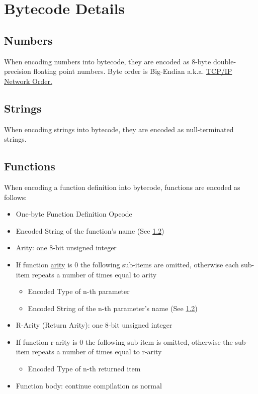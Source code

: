 \documentclass{article}
\begin{document}
\clearpage
\section{Bytecode Details}

\subsection{Numbers}
When encoding numbers into bytecode, they are encoded as 8-byte double-precision floating point numbers. Byte order is Big-Endian a.k.a. \href{https://www.rfc-editor.org/rfc/rfc1700}{TCP/IP Network Order.}

\subsection{Strings} \label{ssec:stringencode}
When encoding strings into bytecode, they are encoded as null-terminated strings.

\subsection{Functions}
When encoding a function definition into bytecode, functions are encoded as follows:
\begin{itemize}
	\item One-byte Function Definition Opcode
	\item Encoded String of the function's name (See \ref{ssec:stringencode})
	\item Arity: one 8-bit unsigned integer
	\item If function \href{https://en.wikipedia.org/wiki/Arity}{arity} is 0 the following sub-items are omitted, otherwise each sub-item repeats a number of times equal to arity
		\begin{itemize}
			\item Encoded Type of n-th parameter
			\item Encoded String of the n-th parameter's name (See \ref{ssec:stringencode})
		\end{itemize}
	\item R-Arity (Return Arity): one 8-bit unsigned integer
	\item If function r-arity is 0 the following sub-item is omitted, otherwise the sub-item repeats a number of times equal to r-arity
		\begin{itemize}
			\item Encoded Type of n-th returned item
		\end{itemize}
	\item Function body: continue compilation as normal
\end{itemize}
\end{document}
